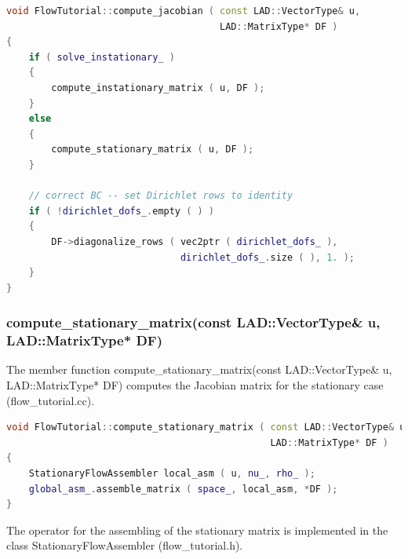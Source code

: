\documentclass[a4paper, 11pt, twoside]{article}
\begin{document}
\begin{lstlisting}[language=C++, basicstyle={\footnotesize, \ttfamily}, keywordstyle=\color{blue},  numbers=none, tabsize=4]
void FlowTutorial::compute_jacobian ( const LAD::VectorType& u,
                                      LAD::MatrixType* DF )
{
    if ( solve_instationary_ )
    {
        compute_instationary_matrix ( u, DF );
    }
    else
    {
        compute_stationary_matrix ( u, DF );
    }

    // correct BC -- set Dirichlet rows to identity
    if ( !dirichlet_dofs_.empty ( ) )
    {
        DF->diagonalize_rows ( vec2ptr ( dirichlet_dofs_ ), 
                               dirichlet_dofs_.size ( ), 1. );
    }
}
\end{lstlisting}

\subsubsection{compute\_stationary\_matrix(const LAD::VectorType\& u, LAD::MatrixType* DF)}
The member function compute\_stationary\_matrix(const LAD::VectorType\& u, LAD::MatrixType* DF) computes the Jacobian matrix for the stationary case (flow\_tutorial.cc).

\begin{lstlisting}[language=C++, basicstyle={\footnotesize, \ttfamily}, keywordstyle=\color{blue}, numbers=none, tabsize=4]
void FlowTutorial::compute_stationary_matrix ( const LAD::VectorType& u,
                                               LAD::MatrixType* DF )
{
    StationaryFlowAssembler local_asm ( u, nu_, rho_ );
    global_asm_.assemble_matrix ( space_, local_asm, *DF );
}
\end{lstlisting}

The operator for the assembling of the stationary matrix is implemented in the class StationaryFlowAssembler (flow\_tutorial.h).
\end{document}
